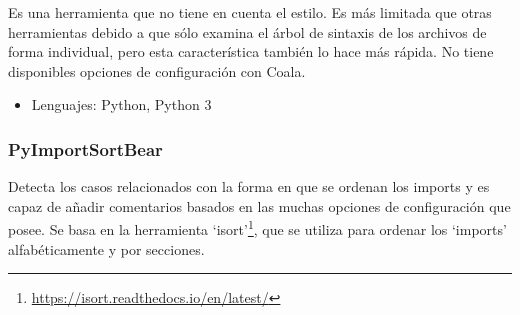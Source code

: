 \documentclass[a4paper, 12pt]{book}
\begin{document}
Es una herramienta que no tiene en cuenta el estilo. Es más limitada que otras herramientas debido a que sólo examina el árbol de sintaxis de los archivos de forma individual, pero esta característica también lo hace más rápida. No tiene disponibles opciones de configuración con Coala.

\begin{itemize}
  \item Lenguajes: Python, Python 3
\end{itemize}

\subsubsection{PyImportSortBear}
\label{sec:seccion1.2.9}
Detecta los casos relacionados con la forma en que se ordenan los imports y es capaz de añadir comentarios basados en las muchas opciones de configuración que posee. Se basa en la herramienta `isort'\footnote{\url{https://isort.readthedocs.io/en/latest/}}, que se utiliza para ordenar los `imports' alfabéticamente y por secciones.
\end{document}
